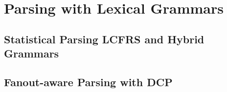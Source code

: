 \documentclass[../document.tex]{subfiles}
\begin{document}
    \chapter{Parsing with Lexical Grammars}
    \section{Statistical Parsing LCFRS and Hybrid Grammars}
    \section{Fanout-aware Parsing with DCP}
\end{document}

